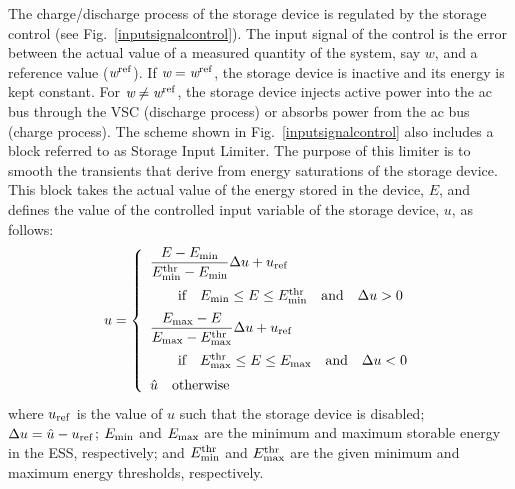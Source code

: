 \documentclass[journal, a4paper]{IEEEtran}
\begin{document}
The charge/discharge process of the storage device is regu\-lated by
the storage control (see Fig.~\ref{inputsignalcontrol}).  The input
signal of the control is the error between the actual value of a
measured quantity of the system, say $\textit{w}$, and a reference
value ($\textit{w}^{\rm ref}$). If $\textit{w} = \textit{w}^{\rm
  ref}$, the storage device is inactive and its energy is kept
constant.  For $\textit{w} \ne \textit{w}^{\rm ref}$, the storage
device injects active power into the ac bus through the VSC (discharge
process) or absorbs power from the ac bus (charge process). 
The scheme shown in Fig.~\ref{inputsignalcontrol} also includes a block
  referred to as Storage Input Limiter\cite{ortega:15}. The
  purpose of this limiter is to smooth the transients that derive from
  energy saturations of the storage device. 
  This block takes the actual
  value of the energy stored in the device, $E$, and defines the value
  of the controlled input variable of the storage device, $u$, as
  follows:
\begin{equation}
  u = \left\{ \begin{array}{l}
      \displaystyle \frac{E - E_{\rm min}}{E_{\rm min}^{\rm thr} - E_{\rm min}} \Delta u + u_{\rm ref} 
      \vspace*{0.2cm}
      \\ \vspace*{0.2cm}
      \quad \quad \text{if} \quad E_{\rm min} \leq E \leq E_{\rm min}^{\rm thr}
      \quad \text{and} \quad \Delta u > 0 
      \\ \vspace*{0.2cm}
      \displaystyle \frac{E_{\rm max} - E}{E_{\rm max} - E_{\rm max}^{\rm thr}} \Delta u + u_{\rm ref} 
      \\	 \vspace*{0.2cm} 
      \quad \quad \text{if} \quad E_{\rm max}^{\rm thr} \leq E \leq E_{\rm max}
      \quad \text{and} \quad \Delta u < 0\\     	
      \displaystyle \hat{u} \quad \text{otherwise}\\
    \end{array} \right.
  \label{outputlimiter}
\end{equation}
where $u_{\rm ref}$ is the value of $u$ such that the storage device
is disabled; $\Delta u = \hat{u} - u_{\rm ref}$; $E_{\rm min}$ and
$E_{\rm max}$ are the minimum and maximum storable energy in the ESS,
respectively; and $E_{\rm min}^{\rm thr}$ and $E_{\rm max}^{\rm thr}$
are the given minimum and maximum energy thresholds, respectively. 
\end{document}
